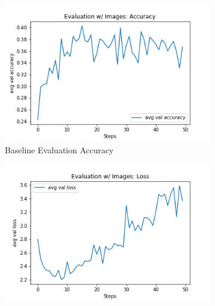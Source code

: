\begin{figure}[ht!]
     \centering
     \begin{subfigure}[b]{0.3\textwidth}
         \centering
         \includegraphics[width=\textwidth]{./figure/results/baseline_and_blindfolding/images/avg val accuracy.png}
         \caption{Baseline Evaluation Accuracy} %
         \label{fig:baseline_accuracy}
     \end{subfigure}
     \hfill
          \begin{subfigure}[b]{0.3\textwidth}
         \centering
         \includegraphics[width=\textwidth]{./figure/results/baseline_and_blindfolding/images/avg val loss.png}

\end{subfigure}
\end{figure}
